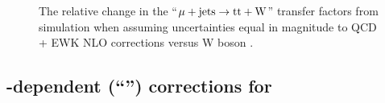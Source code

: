 \begin{figure}[!h]
{  } \\
   ~
   \\
  \caption{\label{fig:tfSyst_nlo_muToTtw} The relative change in the
    ``$\mu + \textrm{jets} \rightarrow \mathrm{tt+W}$'' transfer factors from
    simulation when assuming uncertainties equal in magnitude to QCD +
    EWK NLO corrections versus W boson \Pt.  }
\end{figure}

\clearpage
\subsection{\texorpdfstring{\njet}{Njet}-dependent (``\texorpdfstring{\nisr}{Nisr}'') corrections for \texorpdfstring{\ttbar}{TTbar}}


